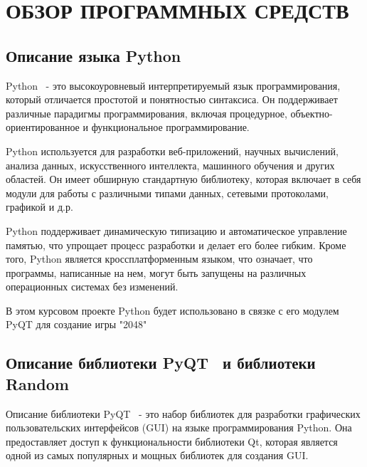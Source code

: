 \chapter{\label{ch:ch01}ОБЗОР ПРОГРАММНЫХ СРЕДСТВ} %


\section{\label{subsec:ch01/sec01/sub01}Описание языка Python}

Python~\cite{python} - это высокоуровневый интерпретируемый язык программирования, который отличается простотой и понятностью синтаксиса. Он поддерживает различные парадигмы программирования, включая процедурное, объектно-ориентированное и функциональное программирование.

Python используется для разработки веб-приложений, научных вычислений, анализа данных, искусственного интеллекта, машинного обучения и других областей. Он имеет обширную стандартную библиотеку, которая включает в себя модули для работы с различными типами данных, сетевыми протоколами, графикой и д.р.

Python поддерживает динамическую типизацию и автоматическое управление памятью, что упрощает процесс разработки и делает его более гибким. Кроме того, Python является кроссплатформенным языком, что означает, что программы, написанные на нем, могут быть запущены на различных операционных системах без изменений.

В этом курсовом проекте Python будет использовано в связке с его модулем PyQT для создание игры "2048"

\section{\label{subsec:ch01/sec01/sub01}Описание библиотеки PyQT~\cite{РуковотствоPyQt5}  и библиотеки Random}
Описание библиотеки 
PyQT~\cite{PyQt} - это набор библиотек для разработки графических пользовательских интерфейсов (GUI) на языке программирования Python. Она предоставляет доступ к функциональности библиотеки Qt, которая является одной из самых популярных и мощных библиотек для создания GUI.

